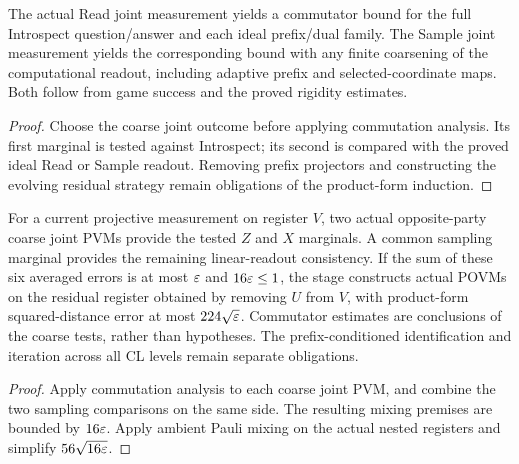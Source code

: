 \begin{lemma}
\label{lem:intro-actual-product-commutators}
\leanok
The actual Read joint measurement yields a commutator bound for the full
Introspect question/answer and each ideal prefix/dual family. The Sample
joint measurement yields the corresponding bound with any finite coarsening
of the computational readout, including adaptive prefix and selected-coordinate
maps. Both follow from game success and the proved rigidity estimates.
\end{lemma}
\begin{proof}
\leanok
Choose the coarse joint outcome before applying commutation analysis.
Its first marginal is tested against Introspect; its second is compared
with the proved ideal Read or Sample readout. Removing prefix projectors
and constructing the evolving residual strategy remain obligations of the
product-form induction.
\end{proof}

\begin{lemma}
\label{lem:intro-coarse-product-stage}
\leanok
For a current projective measurement on register $V$, two actual
opposite-party coarse joint PVMs provide the tested $Z$ and $X$ marginals.
A common sampling marginal provides the remaining linear-readout consistency.
If the sum of these six averaged errors is at most $\varepsilon$ and
$16\varepsilon\leq1$, the stage constructs actual POVMs on the residual register
obtained by removing $U$ from $V$, with product-form squared-distance error at most
$224\sqrt{\varepsilon}$. Commutator estimates are conclusions of the coarse
tests, rather than hypotheses. The prefix-conditioned identification and
iteration across all CL levels remain separate obligations.
\end{lemma}
\begin{proof}
\leanok
Apply commutation analysis to each coarse joint PVM, and combine the two
sampling comparisons on the same side. The resulting mixing premises are
bounded by $16\varepsilon$. Apply ambient Pauli mixing on the actual nested
registers and simplify $56\sqrt{16\varepsilon}$.
\end{proof}


